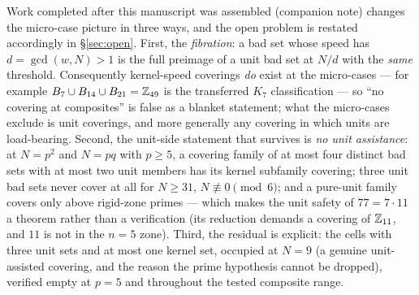 \begin{remark}
\label{rem:postcomposite}
Work completed after this manuscript was assembled (companion note) changes
the micro-case picture in three ways, and the open problem is restated
accordingly in \S\ref{sec:open}. First, the \emph{fibration}: a bad set
whose speed has $d=\gcd(w,N)>1$ is the full preimage of a unit bad set at
$N/d$ with the \emph{same} threshold. Consequently kernel-speed coverings
\emph{do} exist at the micro-cases --- for example
$B_7\cup B_{14}\cup B_{21}=\mathbb{Z}_{49}$ is the transferred $K_7$ classification
--- so ``no covering at composites'' is false as a blanket statement; what
the micro-cases exclude is unit coverings, and more generally any covering
in which units are load-bearing. Second, the unit-side statement that
survives is \emph{no unit assistance}: at $N=p^2$ and $N=pq$ with
$p\ge5$, a covering family of at most four distinct bad sets with at most
two unit members has its kernel subfamily covering; three unit bad sets
never cover at all for $N\ge31$, $N\not\equiv0\pmod6$; and a pure-unit
family covers only above rigid-zone primes --- which makes the unit safety
of $77=7\cdot11$ a theorem rather than a verification (its reduction
demands a covering of $\mathbb{Z}_{11}$, and $11$ is not in the $n=5$ zone). Third,
the residual is explicit: the cells with three unit sets and at most one
kernel set, occupied at $N=9$ (a genuine unit-assisted covering, and the
reason the prime hypothesis cannot be dropped), verified empty at $p=5$
and throughout the tested composite range.


\end{remark}
